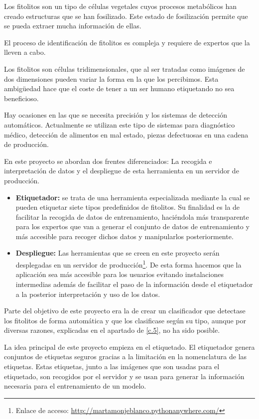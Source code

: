 Los fitolitos son un tipo de células vegetales cuyos procesos metabólicos han creado estructuras que se han fosilizado. Este estado de fosilización permite que se pueda extraer mucha información de ellas.

El proceso de identificación de fitolitos es compleja y requiere de expertos que la lleven a cabo.

Los fitolitos son células tridimensionales, que al ser tratadas como imágenes de dos dimensiones pueden variar la forma en la que los percibimos. Esta ambigüedad hace que el coste de tener a un ser humano etiquetando no sea beneficioso.

Hay ocasiones en las que se necesita precisión y los sistemas de detección automáticos. Actualmente se utilizan este tipo de sistemas para diagnóstico médico, detección de alimentos en mal estado, piezas defectuosas en una cadena de producción.

En este proyecto se abordan dos frentes diferenciados: La recogida e interpretación de datos y el despliegue de esta herramienta en un servidor de producción. 
\begin{itemize}
	\item \textbf{Etiquetador:} se trata de una herramienta especializada mediante la cual se pueden etiquetar siete tipos predefinidos de fitolitos. Su finalidad es la de facilitar la recogida de datos de entrenamiento, haciéndola más transparente para los expertos que van a generar el conjunto de datos de entrenamiento y más accesible para recoger dichos datos y manipularlos posteriormente.

	\item \textbf{Despliegue:} Las herramientas que se creen en este proyecto serán desplegadas en un servidor de producción\footnote{Enlace de acceso: \url{http://martamonjeblanco.pythonanywhere.com/}}. 
	De esta forma hacemos que la aplicación sea más accesible para los usuarios	evitando instalaciones intermedias además de facilitar el paso de la información desde el etiquetador a la posterior interpretación y uso de los datos.
	
\end{itemize}

Parte del objetivo de este proyecto era la de crear un clasificador que detectase los fitolitos de forma automática y que los clasificase según su tipo, aunque por diversas razones, explicadas en el apartado de \ref{c.5}, no ha sido posible.

 La idea principal de este proyecto empieza en el etiquetado. El etiquetador genera conjuntos de etiquetas seguros gracias a la limitación en la nomenclatura de las etiquetas. Estas etiquetas, junto a las imágenes que son usadas para el etiquetado, son recogidos por el servidor y se usan para generar la información necesaria para el entrenamiento de un modelo.

